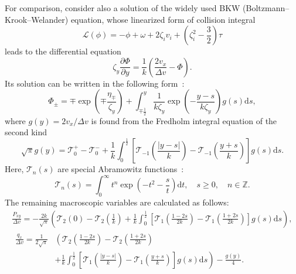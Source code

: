 \documentclass[review]{elsarticle}
\newcommand{\dd}{\mathrm{d}}
\newcommand{\pder}[2][]{\frac{\partial#1}{\partial#2}}
\begin{document}
For comparison, consider also a solution of the widely used BKW (Boltzmann--Krook--Welander) equation,
whose linearized form of collision integral
\begin{equation}\label{eq:linear_bkw}
    \mathcal{L}(\phi) = -\phi + \omega + 2\zeta_i v_i + \left(\zeta_i^2-\frac32\right)\tau
\end{equation}
leads to the differential equation
\begin{equation}\label{eq:linear_bkw_equation}
    \zeta_y \pder[\Phi]{y} = \frac1{k}\left( \frac{2v_x}{\Delta{v}} - \Phi \right).
\end{equation}
Its solution can be written in the following form~\citep{Willis1962}:
\begin{equation}\label{eq:bkw_solution}
    \Phi_\pm = \mp \exp\left(\mp\frac{\eta_\mp}{\zeta_y}\right) +
        \int_{\mp\frac12}^y \frac1{k\zeta_y} \exp \left(-\frac{y-s}{k\zeta_y}\right) g(s) \dd{s},
\end{equation}
where \(g(y) = 2v_x/\Delta v\) is found from the Fredholm integral equation of the second kind
\begin{equation}\label{eq:bkw_g_equation}
    \sqrt{\pi} g(y) = \mathcal{T}_0^+ - \mathcal{T}_0^-
        + \frac1k \int_0^{\frac12} \left[ \mathcal{T}_{-1}\left(\frac{|y-s|}{k}\right)
        - \mathcal{T}_{-1}\left(\frac{y+s}{k}\right) \right] g(s) \dd{s}.
\end{equation}
Here, \(\mathcal{T}_n(s)\) are special Abramowitz functions~\citep{Abramowitz1972}:
\begin{equation}\label{eq:Abramowitz}
    \mathcal{T}_n(s) = \int_0^\infty t^n \exp\left(-t^2-\frac{s}{t}\right) \dd t,
    \quad s\ge0, \quad n \in \mathbb{Z}.
\end{equation}
The remaining macroscopic variables are calculated as follows:
\begin{gather}
    \frac{P_{xy}}{\Delta v} = -\frac{2k}{\sqrt{\pi}} \left(
        \mathcal{T}_2(0)-\mathcal{T}_2\left(\frac1k\right)
        + \frac1k\int_0^{\frac12}\left[
            \mathcal{T}_1\left(\frac{1-2s}{2k}\right)-\mathcal{T}_1\left(\frac{1+2s}{2k}\right)
        \right]g(s)\dd{s}
        \right), \label{eq:bkw_macro_Pxy} \\
    \begin{aligned}
    \frac{q_x}{\Delta v} = \frac1{2\sqrt{\pi}}&\left(
        \mathcal{T}_2\left(\frac{1-2s}{2k}\right) - \mathcal{T}_2\left(\frac{1+2s}{2k}\right)\right. \\
        &+\left. \frac1k\int_0^{\frac12}\left[
            \mathcal{T}_1\left(\frac{|y-s|}k\right)-\mathcal{T}_1\left(\frac{y+s}k\right)
        \right]g(s)\dd{s}
        \right) - \frac{g(y)}4.
    \end{aligned} \label{eq:bkw_macro_qx}
\end{gather}
\end{document}
